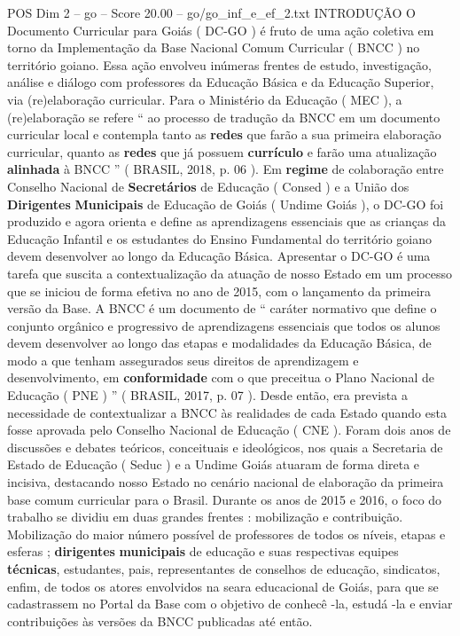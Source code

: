 \begin{textsample}{POS Dim 2 – go – Score 20.00 – go/go\_inf\_e\_ef\_2.txt}  \label{ex:f2_pos_179}
INTRODUÇÃO O Documento Curricular para Goiás ( DC-GO ) é fruto de uma ação coletiva em torno da Implementação da Base Nacional Comum Curricular ( BNCC ) no território goiano.
Essa ação envolveu inúmeras frentes de estudo, investigação, análise e diálogo com professores da Educação Básica e da Educação Superior, via (re)elaboração curricular.
Para o Ministério da Educação ( MEC ), a (re)elaboração se refere “ ao processo de tradução da BNCC em um documento curricular local e contempla tanto as \textbf{redes} que farão a sua primeira elaboração curricular, quanto as \textbf{redes} que já possuem \textbf{currículo} e farão uma atualização \textbf{alinhada} à BNCC ” ( BRASIL, 2018, p. 06 ).
Em \textbf{regime} de colaboração entre Conselho Nacional de \textbf{Secretários} de Educação ( Consed ) e a União dos \textbf{Dirigentes} \textbf{Municipais} de Educação de Goiás ( Undime Goiás ), o DC-GO foi produzido e agora orienta e define as aprendizagens essenciais que as crianças da Educação Infantil e os estudantes do Ensino Fundamental do território goiano devem desenvolver ao longo da Educação Básica.
Apresentar o DC-GO é uma tarefa que suscita a contextualização da atuação de nosso Estado em um processo que se iniciou de forma efetiva no ano de 2015, com o lançamento da primeira versão da Base.
A BNCC é um documento de “ caráter normativo que define o conjunto orgânico e progressivo de aprendizagens essenciais que todos os alunos devem desenvolver ao longo das etapas e modalidades da Educação Básica, de modo a que tenham assegurados seus direitos de aprendizagem e desenvolvimento, em \textbf{conformidade} com o que preceitua o Plano Nacional de Educação ( PNE ) ” ( BRASIL, 2017, p. 07 ).
Desde então, era prevista a necessidade de contextualizar a BNCC às realidades de cada Estado quando esta fosse aprovada pelo Conselho Nacional de Educação ( CNE ).
Foram dois anos de discussões e debates teóricos, conceituais e ideológicos, nos quais a Secretaria de Estado de Educação ( Seduc ) e a Undime Goiás atuaram de forma direta e incisiva, destacando nosso Estado no cenário nacional de elaboração da primeira base comum curricular para o Brasil.
Durante os anos de 2015 e 2016, o foco do trabalho se dividiu em duas grandes frentes : mobilização e contribuição.
Mobilização do maior número possível de professores de todos os níveis, etapas e esferas ; \textbf{dirigentes} \textbf{municipais} de educação e suas respectivas equipes \textbf{técnicas}, estudantes, pais, representantes de conselhos de educação, sindicatos, enfim, de todos os atores envolvidos na seara educacional de Goiás, para que se cadastrassem no Portal da Base com o objetivo de conhecê -la, estudá -la e enviar contribuições às versões da BNCC publicadas até então.

\end{textsample}
